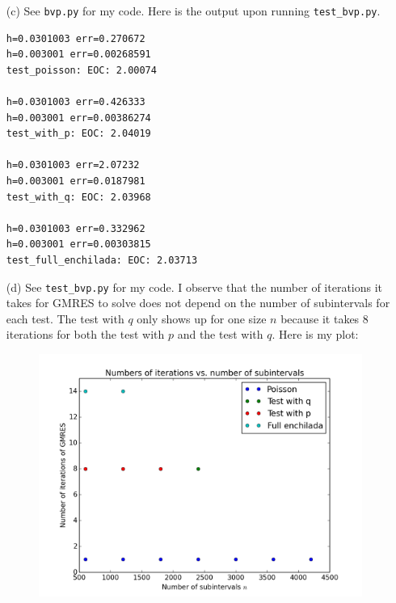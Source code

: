 \documentclass[10pt]{article}
\begin{document}
\begin{itemize}
\newpage

\item[(c)] See \verb+bvp.py+ for my code. Here is the output upon running \verb+test_bvp.py+.

\begin{verbatim}
h=0.0301003 err=0.270672
h=0.003001 err=0.00268591
test_poisson: EOC: 2.00074

h=0.0301003 err=0.426333
h=0.003001 err=0.00386274
test_with_p: EOC: 2.04019

h=0.0301003 err=2.07232
h=0.003001 err=0.0187981
test_with_q: EOC: 2.03968

h=0.0301003 err=0.332962
h=0.003001 err=0.00303815
test_full_enchilada: EOC: 2.03713
\end{verbatim}

\item[(d)] See \verb+test_bvp.py+ for my code. I observe that the number of iterations it takes for GMRES to solve does not depend on the number of subintervals for each test. The test with $q$ only shows up for one size $n$ because it takes 8 iterations for both the test with $p$ and the test with $q$. Here is my plot: 

\begin{figure}[H]
  \centering
    \includegraphics[scale=0.63]{iteration_counts}
\end{figure}

\end{itemize}

\newpage

\end{document}
